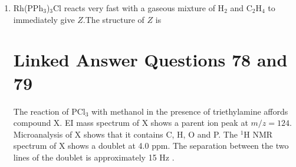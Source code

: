 \documentclass[12pt]{article}
\begin{document}
\begin{enumerate}
\item Rh(PPh$_3$)$_3$Cl reacts very fast with a gaseous mixture of H$_2$ and C$_2$H$_4$ to immediately give $Z$.The structure of $Z$ is

    \hfill{}


\section*{Linked Answer Questions 78 and 79}

The reaction of PCl$_3$ with methanol in the presence of triethylamine affords compound X. EI mass spectrum of X shows a parent ion peak at $m/z = 124$. Microanalysis of X shows that it contains C, H, O and P. The $^1$H NMR spectrum of X shows a doublet at 4.0 ppm. The separation between the two lines of the doublet is approximately 15 Hz .




\end{enumerate}
\end{document}
